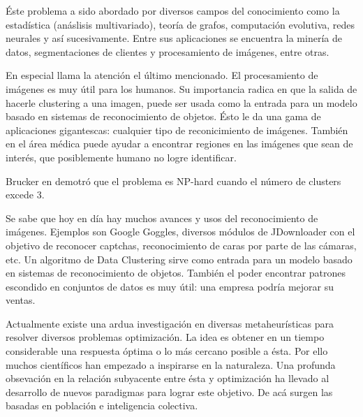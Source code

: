 \'Este problema a sido abordado por diversos campos del conocimiento como la estad\'istica
(an\'aslisis multivariado), teor\'ia de grafos, computaci\'on evolutiva, redes neurales y
as\'i sucesivamente\cite{SwAjAm2009}. Entre sus aplicaciones se encuentra la miner\'ia de datos, 
segmentaciones de clientes y procesamiento de im\'agenes, entre otras. \cite{GaChJi2007}

En especial llama la atenci\'on el \'ultimo mencionado. El procesamiento de im\'agenes es muy \'util para los
humanos. Su importancia radica en que la salida de hacerle clustering a una imagen, puede ser usada como la entrada para 
un modelo basado en sistemas de reconocimiento de objetos.
\'Esto le da una gama de aplicaciones gigantescas: cualquier tipo de reconicimiento de im\'agenes.
Tambi\'en en el \'area m\'edica puede ayudar a encontrar regiones en las im\'agenes que sean de inter\'es,
que posiblemente humano no logre identificar.

Brucker en \cite{Br1978} demotr\'o que el problema es NP-hard cuando el n\'umero 
de clusters excede 3.

\vspace{5 mm}

\label{sect:justificacion}
\vspace{5 mm}

Se sabe que hoy en d\'ia hay muchos avances y usos del reconocimiento de im\'agenes.
Ejemplos son Google Goggles, diversos m\'odulos de JDownloader con el objetivo de reconocer
captchas, reconocimiento de caras por parte de las c\'amaras, etc. Un algoritmo de
Data Clustering sirve como entrada para un modelo basado en sistemas de
reconocimiento de objetos. Tambi\'en el poder encontrar patrones escondido en
conjuntos de datos es muy \'util: una empresa podr\'ia mejorar su ventas.

\vspace{5 mm}

\label{sect:planteamiento}
\vspace{5 mm}

Actualmente existe una ardua investigaci\'on en diversas metaheur\'isticas para
resolver diversos problemas optimizaci\'on. La idea es obtener en un tiempo
considerable una respuesta \'optima o lo m\'as cercano posible a \'esta. Por
ello muchos cient\'ificos han empezado a inspirarse en la naturaleza.
Una profunda obsevaci\'on en la relaci\'on subyacente 
entre \'esta y optimizaci\'on ha llevado al desarrollo de nuevos paradigmas
para lograr este objetivo\cite{SwAjAm2009}. De ac\'a surgen las basadas en poblaci\'on e inteligencia
colectiva.

